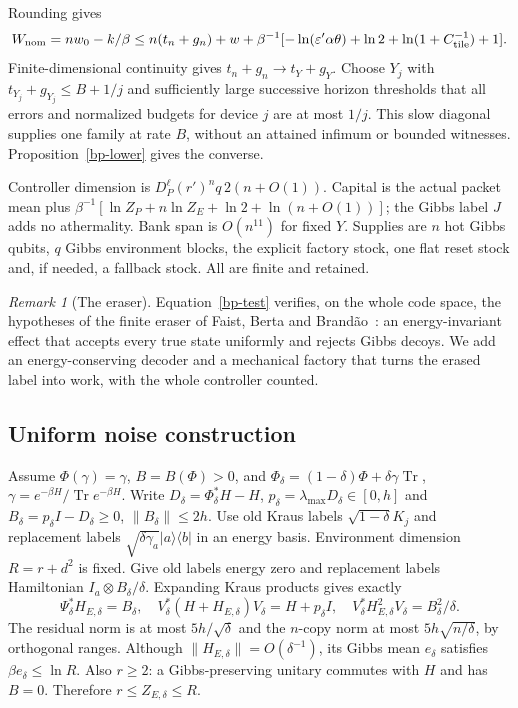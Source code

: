 \documentclass[11pt]{article}
\theoremstyle{definition}
\theoremstyle{remark}
\newtheorem{remark}{Remark}
\newcommand{\Tr}{\operatorname{Tr}}
\begin{document}
Rounding gives
\[
 W_{\rm nom}=nw_0-k/\beta
 \le n(t_n+g_n)+w+\beta^{-1}
 [-\ln(\varepsilon'\alpha\theta)+\ln2+
              \ln(1+C_{\rm tile}^{-1})+1].
\]
Finite-dimensional continuity gives $t_n+g_n\to t_Y+g_Y$.
Choose $Y_j$ with $t_{Y_j}+g_{Y_j}\le B+1/j$ and sufficiently large
successive horizon thresholds that all errors and normalized budgets
for device $j$ are at most $1/j$. This slow diagonal supplies one
family at rate $B$, without an attained infimum or bounded witnesses.
Proposition~\ref{bp-lower} gives the converse.

Controller dimension is $D_P^\ell(r')^nq\,2(n+O(1))$.
Capital is the actual packet mean plus
$\beta^{-1}[\ln Z_P+n\ln Z_E+\ln2+\ln(n+O(1))]$;
the Gibbs label $J$ adds no athermality. Bank span is $O(n^{11})$
for fixed $Y$. Supplies are $n$ hot Gibbs qubits, $q$ Gibbs
environment blocks, the explicit factory stock, one flat reset stock
and, if needed, a fallback stock. All are finite and retained.

\begin{remark}[The eraser]
Equation~\eqref{bp-test} verifies, on the whole code space, the hypotheses of the finite eraser of Faist, Berta and Brand\~ao~\cite[Prop.~7.1]{FBB21}: an energy-invariant effect that accepts every true state uniformly and rejects Gibbs decoys. We add an energy-conserving decoder and a mechanical factory that turns the erased label into work, with the whole controller counted.
\end{remark}

\subsection{Uniform noise construction}
Assume $\Phi(\gamma)=\gamma$, $B=B(\Phi)>0$, and
$\Phi_\delta=(1-\delta)\Phi+\delta\gamma\Tr$,
$\gamma=e^{-\beta H}/\Tr e^{-\beta H}$.
Write $D_\delta=\Phi_\delta^*H-H$,
$p_\delta=\lambda_{\max}D_\delta\in[0,h]$ and
$B_\delta=p_\delta I-D_\delta\ge0$, $\|B_\delta\|\le2h$.
Use old Kraus labels $\sqrt{1-\delta}K_j$ and replacement labels
$\sqrt{\delta\gamma_a}|a\rangle\langle b|$ in an energy basis.
Environment dimension $R=r+d^2$ is fixed. Give old labels energy
zero and replacement labels Hamiltonian $I_a\otimes B_\delta/\delta$.
Expanding Kraus products gives exactly
\[
 \Psi_\delta^*H_{E,\delta}=B_\delta,\quad
 V_\delta^*(H+H_{E,\delta})V_\delta=H+p_\delta I,\quad
 V_\delta^*H_{E,\delta}^2V_\delta=B_\delta^2/\delta .
\]
The residual norm is at most $5h/\sqrt\delta$ and the $n$-copy norm
at most $5h\sqrt{n/\delta}$, by orthogonal ranges.
Although $\|H_{E,\delta}\|=O(\delta^{-1})$, its Gibbs mean
$e_\delta$ satisfies $\beta e_\delta\le\ln R$.
Also $r\ge2$: a Gibbs-preserving unitary commutes with $H$ and has
$B=0$. Therefore $r\le Z_{E,\delta}\le R$.
\end{document}
